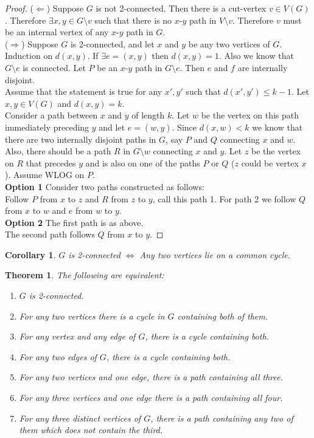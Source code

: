 \documentclass{article}
\newtheorem*{thm}{Theorem}
\newtheorem*{cor}{Corollary}
\theoremstyle{definition}
\begin{document}
\begin{proof}
($\Leftarrow$) Suppose $G$ is not 2-connected.
Then there is a cut-vertex $v\in V(G)$.
Therefore $\exists x,y\in G\setminus v$ such that there is no $x$-$y$ path in $V\setminus v$.
Therefore $v$ must be an internal vertex of any $x$-$y$ path in $G$. \\
($\Rightarrow$) Suppose $G$ is 2-connected, and let $x$ and $y$ be any two vertices of $G$.
Induction on $d(x,y)$.
If $\exists e=(x,y)$ then $d(x,y) = 1$.
Also we know that $G\setminus e$ is connected.
Let $P$ be an $x$-$y$ path in $G\setminus e$.
Then $e$ and $f$ are internally disjoint. \\
Assume that the statement is true for any $x',y'$ such that $d(x',y')\le k-1$.
Let $x,y\in V(G)$ and $d(x,y) = k$. \\
Consider a path between $x$ and $y$ of length $k$.
Let $w$ be the vertex on this path immediately preceding $y$ and let $e=(w,y)$.
Since $d(x,w)<k$ we know that there are two internally disjoint paths in $G$, say $P$ and $Q$ connecting $x$ and $w$.
Also, there should be a path $R$ in $G\setminus w$ connecting $x$ and $y$.
Let $z$ be the vertex on $R$ that precedes $y$ and is also on one of the paths $P$ or $Q$ ($z$ could be vertex $x$).
Assume WLOG on $P$. \\
\textbf{Option 1}
Consider two paths constructed as follows: \\
Follow $P$ from $x$ to $z$ and $R$ from $z$ to $y$, call this path 1.
For path 2 we follow $Q$ from $x$ to $w$ and $e$ from $w$ to $y$. \\
\textbf{Option 2}
The first path is as above. \\
The second path follows $Q$ from $x$ to $y$.
\end{proof}

\begin{cor}
$G$ is 2-connected $\iff$ Any two vertices lie on a common cycle.
\end{cor}

\begin{thm}
The following are equivalent:
\begin{enumerate}
\item $G$ is 2-connected.
\item For any two vertices there is a cycle in $G$ containing both of them.
\item For any vertex and any edge of $G$, there is a cycle containing both.
\item For any two edges of $G$, there is a cycle containing both.
\item For any two vertices and one edge, there is a path containing all three.
\item For any three vertices and one edge there is a path containing all four.
\item For any three distinct vertices of $G$, there is a path containing any two of them which does not contain the third.
\end{enumerate}
\end{thm}
\end{document}
